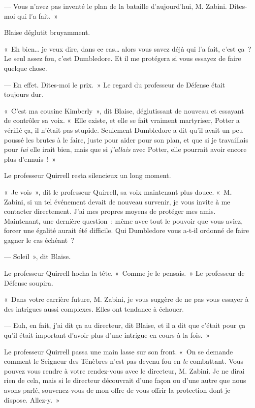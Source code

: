 --- Vous n'avez pas inventé le plan de la bataille d'aujourd'hui, M. Zabini.
Dites-moi qui l'a fait.~»

Blaise déglutit bruyamment.

«~Eh bien… je veux dire, dans ce cas… alors vous savez déjà qui l'a fait, c'est ça~?
Le seul assez fou, c'est Dumbledore.
Et il me protégera si vous essayez de faire quelque chose.

--- En effet.
Dites-moi le prix.~»
Le regard du professeur de Défense était toujours dur.

«~C'est ma cousine Kimberly~», dit Blaise, déglutissant de nouveau et essayant de contrôler sa voix.
«~Elle existe, et elle se fait vraiment martyriser, Potter a vérifié ça, il n'était pas stupide.
Seulement Dumbledore a dit qu'il avait un peu poussé les brutes à le faire, juste pour aider pour son plan, et que si je travaillais pour \emph{lui} elle irait bien, mais que si \emph{j'allais} avec Potter, elle pourrait avoir encore plus d'ennuis~!~»

Le professeur Quirrell resta silencieux un long moment.

«~Je vois~», dit le professeur Quirrell, sa voix maintenant plus douce.
«~M. Zabini, si un tel événement devait de nouveau survenir, je vous invite à me contacter directement.
J'ai mes propres moyens de protéger mes amis.
Maintenant, une dernière question~: même avec tout le pouvoir que vous aviez, forcer une égalité aurait été difficile.
Qui Dumbledore vous a-t-il ordonné de faire gagner le cas échéant~?

--- Soleil~», dit Blaise.

Le professeur Quirrell hocha la tête.
«~Comme je le pensais.~»
Le professeur de Défense soupira.

«~Dans votre carrière future, M. Zabini, je vous suggère de ne pas vous essayer à des intrigues aussi complexes.
Elles ont tendance à échouer.

--- Euh, en fait, j'ai dit ça au directeur, dit Blaise, et il a dit que c'était pour ça qu'il était important d'avoir plus d'une intrigue en cours à la fois.~»

Le professeur Quirrell passa une main lasse sur son front.
«~On se demande comment le Seigneur des Ténèbres n'est pas devenu fou en \emph{le} combattant.
Vous pouvez vous rendre à votre rendez-vous avec le directeur, M. Zabini.
Je ne dirai rien de cela, mais si le directeur découvrait d'une façon ou d'une autre que nous avons parlé, souvenez-vous de mon offre de vous offrir la protection dont je dispose.
Allez-y.~»

